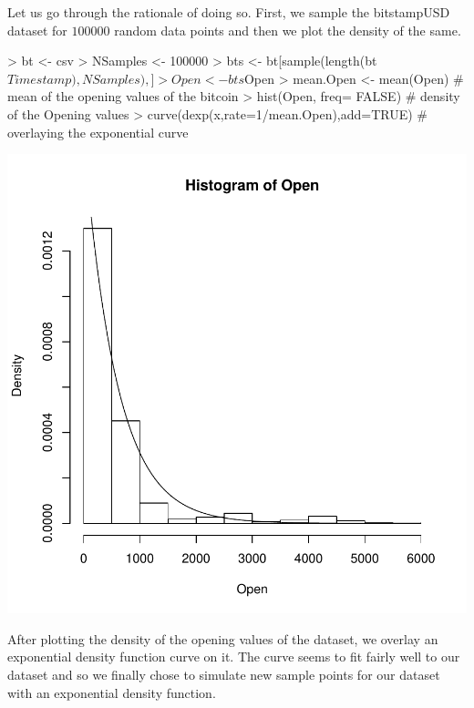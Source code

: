 \documentclass{article}
\begin{document}
Let us go through the rationale of doing so. First, we sample the bitstampUSD dataset for $100000$ random data points and then we plot the density of the same.

\begin{Schunk}
\begin{Sinput}
> bt <- csv
> NSamples <- 100000
> bts <- bt[sample(length(bt$Timestamp),NSamples),]
> Open <- bts$Open
> mean.Open <- mean(Open)     # mean of the opening values of the bitcoin
> hist(Open, freq= FALSE)   # density of the Opening values
> curve(dexp(x,rate=1/mean.Open),add=TRUE)    # overlaying the exponential curve
\end{Sinput}
\end{Schunk}
\includegraphics{Report-005}

After plotting the density of the opening values of the dataset, we overlay an exponential density function curve on it. The curve seems to fit fairly well to our dataset and so we finally chose to simulate new sample points for our dataset with an exponential density function.
\end{document}

